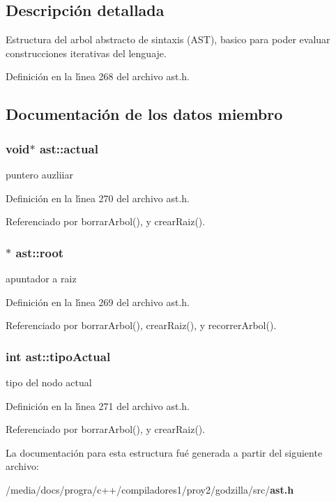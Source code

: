 \subsection{Descripci\'{o}n detallada}
Estructura del arbol abstracto de sintaxis (AST), basico para poder evaluar construcciones iterativas del lenguaje. 



Definici\'{o}n en la l\'{\i}nea 268 del archivo ast.h.

\subsection{Documentaci\'{o}n de los datos miembro}
\subsubsection{\setlength{\rightskip}{0pt plus 5cm}void$\ast$ {\bf ast::actual}}\label{structast_o1}


puntero auzliiar 



Definici\'{o}n en la l\'{\i}nea 270 del archivo ast.h.

Referenciado por borrar\-Arbol(), y crear\-Raiz().
\subsubsection{$\ast$ {\bf ast::root}}\label{structast_o0}


apuntador a raiz 



Definici\'{o}n en la l\'{\i}nea 269 del archivo ast.h.

Referenciado por borrar\-Arbol(), crear\-Raiz(), y recorrer\-Arbol().
\subsubsection{\setlength{\rightskip}{0pt plus 5cm}int {\bf ast::tipo\-Actual}}\label{structast_o2}


tipo del nodo actual 



Definici\'{o}n en la l\'{\i}nea 271 del archivo ast.h.

Referenciado por borrar\-Arbol(), y crear\-Raiz().

La documentaci\'{o}n para esta estructura fu\'{e} generada a partir del siguiente archivo:\begin{CompactItemize}
\item 
/media/docs/progra/c++/compiladores1/proy2/godzilla/src/{\bf ast.h}\end{CompactItemize}
